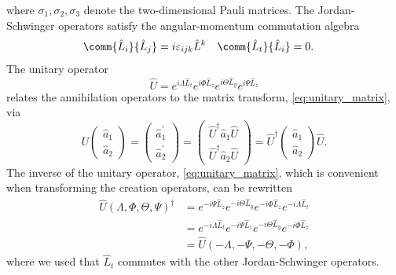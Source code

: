 where $\sigma_1,\sigma_2,\sigma_3$ denote the two-dimensional Pauli matrices.
The Jordan-Schwinger operators satisfy the angular-momentum commutation algebra~\cite[p.~97]{Leonhardt2010}
\begin{align}
	\comm{\hat{L}_i}{\hat{L}_j}
	&=
	i\varepsilon_{ijk}\hat{L}^k
	&
	\comm{\hat{L}_t}{\hat{L}_i}
	&=
	0
	.
\end{align}
The unitary operator
\begin{equation}
	\hat{U}
	=
	e^{i\Lambda\hat{L}_t}
	e^{i\Phi\hat{L}_z}
	e^{i\Theta\hat{L}_y}
	e^{i\Psi\hat{L}_z}
	\label{eq:unitary_operator}
\end{equation}
relates the annihilation operators to the matrix transform, \cref{eq:unitary_matrix}, via~\cite[p.~99]{Leonhardt2010}
\begin{equation}
	U
	\begin{pmatrix}
		\hat{a}_1 \\
		\hat{a}_2
	\end{pmatrix}
	=
	\begin{pmatrix}
		\hat{a}_1^\prime \\
		\hat{a}_2^\prime
	\end{pmatrix}
	=
	\begin{pmatrix}
		\hat{U}^\dagger\hat{a}_1\hat{U} \\
		\hat{U}^\dagger\hat{a}_2\hat{U}
	\end{pmatrix}
	=
	\hat{U}^\dagger
	\begin{pmatrix}
		\hat{a}_1 \\
		\hat{a}_2
	\end{pmatrix}
	\hat{U}
	.
\end{equation}
The inverse of the unitary operator, \cref{eq:unitary_matrix}, which is convenient when transforming the creation operators, can be rewritten
\begin{equation}
	\begin{split}
		\hat{U}(\Lambda,\Phi,\Theta,\Psi)^\dagger
		&=
		e^{-i\Psi\hat{L}_z}
		e^{-i\Theta\hat{L}_y}
		e^{-i\Phi\hat{L}_z}
		e^{-i\Lambda\hat{L}_t}
		\\
		&=
		e^{-i\Lambda\hat{L}_t}
		e^{-i\Psi\hat{L}_z}
		e^{-i\Theta\hat{L}_y}
		e^{-i\Phi\hat{L}_z}
		\\
		&=
		\hat{U}(-\Lambda,-\Psi,-\Theta,-\Phi)
		,
	\end{split}
	\label{eq:unitary_operator_inverse}
\end{equation}
where we used that $\hat{L}_t$ commutes with the other Jordan-Schwinger operators.

